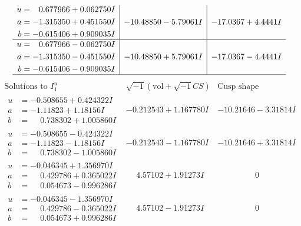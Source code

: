 \documentclass[1p]{elsarticle_modified}
\theoremstyle{definition}
\newcommand{\I}{\sqrt{-1}}
\begin{document}
$$\begin{array}{c|c|c}
\begin{aligned}
u &= \phantom{-}0.677966 + 0.062750 I \\
a &= -1.315350 + 0.451550 I \\
b &= -0.615406 + 0.909035 I\end{aligned}
 & -10.48850 - 5.79061 I & -17.0367 + 4.4441 I \\ \hline\begin{aligned}
u &= \phantom{-}0.677966 - 0.062750 I \\
a &= -1.315350 - 0.451550 I \\
b &= -0.615406 - 0.909035 I\end{aligned}
 & -10.48850 + 5.79061 I & -17.0367 - 4.4441 I\\
 \hline 
 \end{array}$$\newpage$$\begin{array}{c|c|c}  
\text{Solutions to }I^u_{1}& \I (\text{vol} + \sqrt{-1}CS) & \text{Cusp shape}\\
 \hline 
\begin{aligned}
u &= -0.508655 + 0.424322 I \\
a &= -1.11823 + 1.18156 I \\
b &= \phantom{-}0.738302 + 1.005860 I\end{aligned}
 & -0.212543 + 1.167780 I & -10.21646 - 3.31814 I \\ \hline\begin{aligned}
u &= -0.508655 - 0.424322 I \\
a &= -1.11823 - 1.18156 I \\
b &= \phantom{-}0.738302 - 1.005860 I\end{aligned}
 & -0.212543 - 1.167780 I & -10.21646 + 3.31814 I \\ \hline\begin{aligned}
u &= -0.046345 + 1.356970 I \\
a &= \phantom{-}0.429786 + 0.365022 I \\
b &= \phantom{-}0.054673 - 0.996286 I\end{aligned}
 & \phantom{-}4.57102 + 1.91273 I & \phantom{-0.000000 } 0 \\ \hline\begin{aligned}
u &= -0.046345 - 1.356970 I \\
a &= \phantom{-}0.429786 - 0.365022 I \\
b &= \phantom{-}0.054673 + 0.996286 I\end{aligned}
 & \phantom{-}4.57102 - 1.91273 I & \phantom{-0.000000 } 0 \\ \hline\begin{aligned}

\end{aligned}
\end{array}$$
\end{document}
